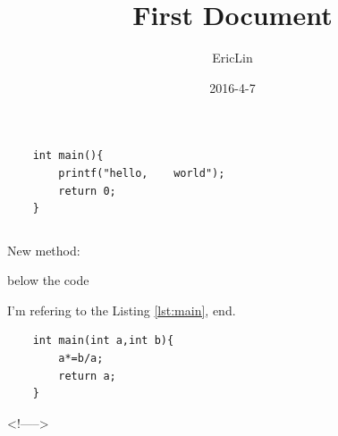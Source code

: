 \documentclass{article}
\title{First Document}
\date{2016-4-7}
\author{EricLin}
\newcommand{\includecode}[2][c]{<!----->}
\begin{document}
\maketitle

\begin{verbatim}
	int main(){
		printf("hello,    world");
		return 0;
	}
\end{verbatim}


\inputminted{cpp}{main.cpp}


New method:
\begin{listing}[h!]
	\caption{below the code}
	\label{lst:previous-main}
\end{listing}

I'm refering to the Listing \ref{lst:main}, end.


\begin{center}
	\begin{lstlisting}
	int main(int a,int b){
		a*=b/a;
		return a;
	}
	\end{lstlisting}
\end{center}



\includecode{main.cpp}
\end{document}
